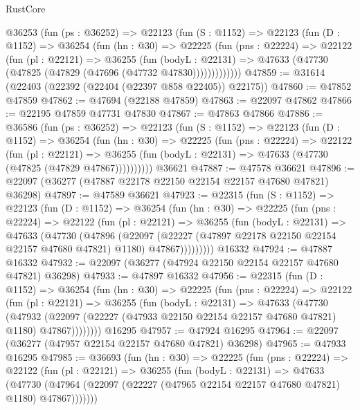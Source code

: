 \begin{lexlean}{RustCore}
\begin{coremodule}
    @36253
      (fun (ps : @36252) =>
      @22123
        (fun (S : @1152) =>
        @22123
          (fun (D : @1152) =>
          @36254
            (fun (hn : @30) =>
            @22225
              (fun (pns : @22224) =>
              @22122
                (fun (pl : @22121) =>
                @36255
                  (fun (bodyL : @22131) =>
                  @47633 (@47730 (@47825 (@47829 (@47696 (@47732 @47830)))))))))))))
@47859 := @31614 (@22403 (@22392 (@22404 (@22397 @858 @22405)) @22175))
@47860 := @47852 @47859
@47862 := @47694 (@22188 @47859)
@47863 := @22097 @47862
@47866 := @22195 @47859 @47731 @47830
@47867 := @47863 @47866
@47886 := @36586
    (fun (ps : @36252) =>
    @22123
      (fun (S : @1152) =>
      @22123
        (fun (D : @1152) =>
        @36254
          (fun (hn : @30) =>
          @22225
            (fun (pns : @22224) =>
            @22122
              (fun (pl : @22121) =>
              @36255 (fun (bodyL : @22131) => @47633 (@47730 (@47825 (@47829 @47867))))))))))
    @36621
@47887 := @47578 @36621
@47896 := @22097 (@36277 (@47887 @22178 @22150 @22154 @22157 @47680 @47821) @36298)
@47897 := @47589 @36621
@47923 := @22315
    (fun (S : @1152) =>
    @22123
      (fun (D : @1152) =>
      @36254
        (fun (hn : @30) =>
        @22225
          (fun (pns : @22224) =>
          @22122
            (fun (pl : @22121) =>
            @36255
              (fun (bodyL : @22131) =>
              @47633
                (@47730
                  (@47896
                    (@22097
                      (@22227 (@47897 @22178 @22150 @22154 @22157 @47680 @47821) @1180)
                      @47867)))))))))
    @16332
@47924 := @47887 @16332
@47932 := @22097 (@36277 (@47924 @22150 @22154 @22157 @47680 @47821) @36298)
@47933 := @47897 @16332
@47956 := @22315
    (fun (D : @1152) =>
    @36254
      (fun (hn : @30) =>
      @22225
        (fun (pns : @22224) =>
        @22122
          (fun (pl : @22121) =>
          @36255
            (fun (bodyL : @22131) =>
            @47633
              (@47730
                (@47932
                  (@22097 (@22227 (@47933 @22150 @22154 @22157 @47680 @47821) @1180) @47867))))))))
    @16295
@47957 := @47924 @16295
@47964 := @22097 (@36277 (@47957 @22154 @22157 @47680 @47821) @36298)
@47965 := @47933 @16295
@47985 := @36693
    (fun (hn : @30) =>
    @22225
      (fun (pns : @22224) =>
      @22122
        (fun (pl : @22121) =>
        @36255
          (fun (bodyL : @22131) =>
          @47633
            (@47730
              (@47964 (@22097 (@22227 (@47965 @22154 @22157 @47680 @47821) @1180) @47867)))))))

\end{coremodule}
\end{lexlean}
